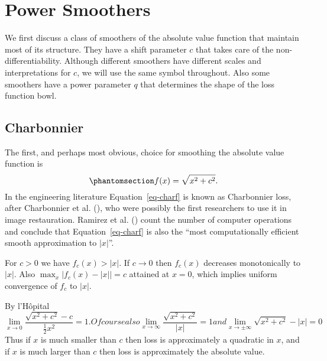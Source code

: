 \documentclass[
  12pt,
  letterpaper,
  DIV=11,
  numbers=noendperiod]{scrartcl}
\newcommand{\sectionbreak}{\pagebreak}
\theoremstyle{plain}
\theoremstyle{plain}
\theoremstyle{plain}
\theoremstyle{definition}
\theoremstyle{definition}
\theoremstyle{remark}
\begin{document}
\sectionbreak

\section{Power Smoothers}\label{power-smoothers}

We first discuss a class of smoothers of the absolute value function
that maintain most of its structure. They have a shift parameter \(c\)
that takes care of the non-differentiability. Although different
smoothers have different scales and interpretations for \(c\), we will
use the same symbol throughout. Also some smoothers have a power
parameter \(q\) that determines the shape of the loss function bowl.

\subsection{Charbonnier}\label{sec-charb}

The first, and perhaps most obvious, choice for smoothing the absolute
value function is \begin{equation}\phantomsection\label{eq-charf}{
f(x)=\sqrt{x^2 + c^2}.
}\end{equation} In the engineering literature Equation~\ref{eq-charf} is
known as Charbonnier loss, after Charbonnier et al.
(), who
were possibly the first researchers to use it in image restauration.
Ramirez et al.
() count the
number of computer operations and conclude that Equation~\ref{eq-charf}
is also the ``most computationally efficient smooth approximation to
\(|x|\)''.

For \(c>0\) we have \(f_c(x)>|x|\). If \(c\rightarrow 0\) then
\(f_c(x)\) decreases monotonically to \(|x|\). Also
\(\max_x|f_c(x)-|x||=c\) attained at \(x=0\), which implies uniform
convergence of \(f_c\) to \(|x|\).

By l'Hôpital \begin{subequations}
\begin{equation}
\lim_{x\rightarrow 0}\frac{\sqrt{x^2+c^2}-c}{\frac12x^2}=1.
\end{equation}
Of course also
\begin{equation}
\lim_{x\rightarrow\infty}\frac{\sqrt{x^2+c^2}}{|x|}=1
\end{equation}
and
\begin{equation}
\lim_{x\rightarrow\pm\infty}\sqrt{x^2+c^2}-|x|=0
\end{equation}
\end{subequations} Thus if \(x\) is much smaller than \(c\) then loss is
approximately a quadratic in \(x\), and if \(x\) is much larger than
\(c\) then loss is approximately the absolute value.
\end{document}
